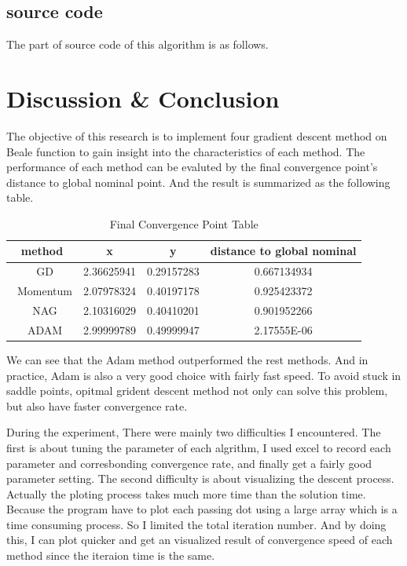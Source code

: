 \documentclass[aps,letterpaper,10pt]{article}
\begin{document}
    \subsection{source code}
    The part of source code of this algorithm is as follows.  \vspace{5mm}
    	
    	\vspace{3mm}


\newpage
\section{Discussion \& Conclusion}
The objective of this research is to implement four gradient descent method on Beale function to gain insight into the characteristics of each method. The performance of each method can be evaluted by the final convergence point's distance to global nominal point. And the result is summarized as the following table.\vspace{3mm}

\begin{table}[htbp]
\begin{center}
  \begin{tabular}{|ccc|c|}
    \hline
    \textbf{method} & \textbf{x} & \textbf{y} & \textbf{distance to global nominal}  \\ \hline
    \ GD & 2.36625941  & 0.29157283 & 0.667134934 \\\hline
    \ Momentum & 2.07978324   & 0.40197178 & 0.925423372 \\\hline
    \ NAG & 2.10316029   & 0.40410201 & 0.901952266 \\\hline
    \ ADAM & 2.99999789   & 0.49999947 & 2.17555E-06 \\\hline
    \end{tabular}
\end{center}
\caption{Final Convergence Point Table}
\label{symbolic}
\end{table}

We can see that the Adam method outperformed the rest methods. And in practice, Adam is also a very good choice with fairly fast speed. To avoid stuck in saddle points, opitmal grident descent method not only can solve this problem, but also have faster convergence rate.\vspace{3mm}

During the experiment, There were mainly two difficulties I encountered. The first is about tuning the parameter of each algrithm, I used excel to record each parameter and corresbonding convergence rate, and finally get a fairly good parameter setting. The second difficulty is about visualizing the descent process. Actually the ploting process takes much more time than the solution time. Because the program have to plot each passing dot using a large array which is a time consuming process. So I limited the total iteration number. And by doing this, I can plot quicker and get an visualized result of convergence speed of each method since the iteraion time is the same.\vspace{3mm}
\end{document}
